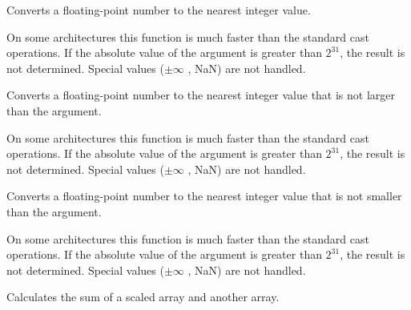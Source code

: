 \else


Converts a floating-point number to the nearest integer value.


\begin{description}
\end{description}

On some architectures this function is much faster than the standard cast
operations. If the absolute value of the argument is greater than
$2^{31}$, the result is not determined. Special values ($\pm \infty$ , NaN)
are not handled.


Converts a floating-point number to the nearest integer value that is not larger than the argument.


\begin{description}
\end{description}

On some architectures this function is much faster than the standard cast
operations. If the absolute value of the argument is greater than
$2^{31}$, the result is not determined. Special values ($\pm \infty$ , NaN)
are not handled.


Converts a floating-point number to the nearest integer value that is not smaller than the argument.


\begin{description}
\end{description}

On some architectures this function is much faster than the standard cast
operations. If the absolute value of the argument is greater than
$2^{31}$, the result is not determined. Special values ($\pm \infty$ , NaN)
are not handled.

\fi


Calculates the sum of a scaled array and another array.


\begin{description}
\end{description}

